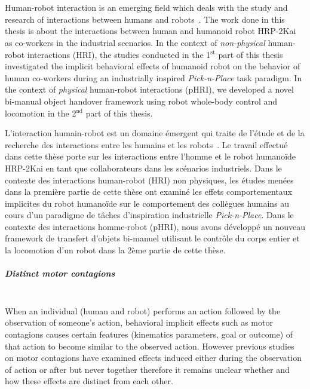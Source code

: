 {\color{blue}\chapter*{}}
\thispagestyle{empty}

Human-robot interaction is an emerging field which deals with the study and research of interactions between humans and robots~\cite{goodrich2008human}. The work done in this thesis is about the interactions between human and humanoid robot HRP-2Kai as co-workers in the industrial scenarios. In the context of \textit{non-physical} human-robot interactions (HRI), the studies conducted in the 1$^\text{st}$ part of this thesis investigated the implicit behavioral effects of humanoid robot on the behavior of human co-workers during an industrially inspired \textit{Pick-n-Place} task paradigm. In the context of \textit{physical} human-robot interactions (pHRI), we developed a novel bi-manual object handover framework using robot whole-body control and locomotion in the 2$^\text{nd}$ part of this thesis.

L'interaction humain-robot est un domaine émergent qui traite de l'étude et de la recherche des interactions entre les humains et les robots~\cite{goodrich2008human}. Le travail effectué dans cette thèse porte sur les interactions entre l'homme et le robot humanoïde HRP-2Kai en tant que collaborateurs dans les scénarios industriels. Dans le contexte des interactions human-robot (HRI) non physiques, les études menées dans la première partie de cette thèse ont examiné les effets comportementaux implicites du robot humanoïde sur le comportement des collègues humains au cours d'un paradigme de tâches d'inspiration industrielle \textit{Pick-n-Place}. Dans le contexte des interactions homme-robot (pHRI), nous avons développé un nouveau framework de transfert d'objets bi-manuel utilisant le contrôle du corps entier et la locomotion d'un robot dans la 2ème partie de cette thèse.\\

\paragraph*{\LARGE {Distinct motor contagions \\}\\}

When an individual (human and robot) performs an action followed by the observation of someone's action, behavioral implicit effects such as motor contagions causes certain features (kinematics parameters, goal or outcome) of that action to become similar to the observed action. However previous studies on motor contagions have examined  effects induced either during the observation of action or after but never together therefore it remains unclear whether and how these effects are distinct from each other.

